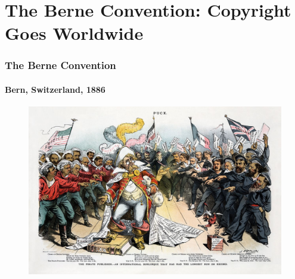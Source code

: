 \section{The Berne Convention: Copyright Goes Worldwide}

\begin{frame}
  \frametitle{The Berne Convention}
  \framesubtitle{Bern, Switzerland, 1886}

  \begin{figure}[h]
    \centering
    \includegraphics[scale=1.2]{images/pirate-publisher}
  \end{figure}

\end{frame}

